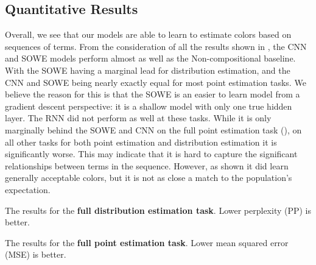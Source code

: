 \documentclass[11pt,a4paper]{article}
\newcommand{\empmodel}{Non-compositional baseline}
\begin{document}
\subsection{Quantitative Results}\label{sec:quantitative-results}

Overall, we see that our models are able to learn to estimate colors based on sequences of terms.
From the consideration of all the results shown in , 
the CNN and SOWE models perform almost as well as the \empmodel{}.
With the SOWE having a marginal lead for distribution estimation,
and the CNN and SOWE being nearly exactly equal for most point estimation tasks.
We believe the reason for this is that the SOWE is an easier to learn model from a gradient descent perspective:
it is a shallow model with only one true hidden layer.
The RNN did not perform as well at these tasks.
While it is only marginally behind the SOWE and CNN on the full point estimation task (), on all other tasks for both point estimation and distribution estimation it is significantly worse.
This may indicate that it is hard to capture the significant relationships between terms in the sequence.
However, as shown  it did learn generally acceptable colors, but it is not as close a match to the population's expectation.



\begin{table}
	\caption{\label{tbl:distfull} The results for the \textbf{full distribution estimation task}. Lower perplexity (PP) is better.}
\end{table}



\begin{table}
	\caption{\label{tbl:pointfull} The results for the \textbf{full point estimation task}. Lower mean squared error (MSE) is better.}
\end{table}
\end{document}
